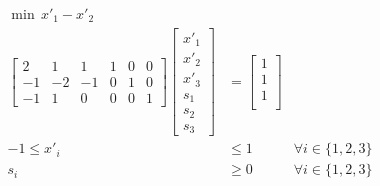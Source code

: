 \documentclass[pdflatex,sn-mathphys-num]{sn-jnl}%
\theoremstyle{thmstyleone}%
\theoremstyle{thmstylethree}%
\theoremstyle{thmstyletwo}%
\begin{document}
\begin{subequations}
\label{eq_example_2}
\begin{align}
    \min\,  x'_1 - x'_2 & \\
    \begin{bmatrix}
        2 & 1 & 1 & 1 & 0 & 0 \\
        -1 & -2 & -1 & 0 & 1 & 0\\
        -1 & 1 & 0 & 0 & 0 & 1
    \end{bmatrix}
    \begin{bmatrix}
        x'_1\\
        x'_2\\
        x'_3 \\
        s_1\\
        s_2\\
        s_3
    \end{bmatrix}
    & = \begin{bmatrix}
    1\\
    1\\
    1\\
\end{bmatrix}\\
-1 \leq x'_i &\leq 1 & \forall i\in \{1,2,3\}\\
s_i &\geq 0 &\forall i \in \{1,2,3\}
\end{align}    
\end{subequations}
\end{document}
